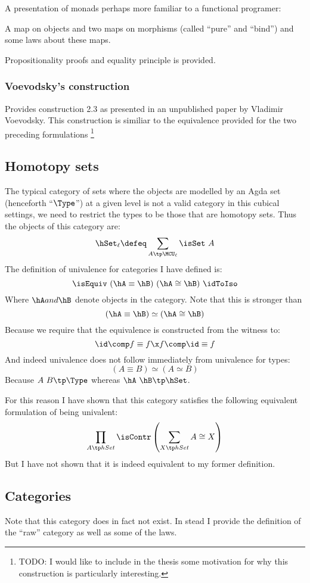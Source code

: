 A presentation of monads perhaps more familiar to a functional programer:

A map on objects and two maps on morphisms (called ``pure'' and ``bind'') and
some laws about these maps.

Propositionality proofs and equality principle is provided.

\subsubsection{Voevodsky's construction}

Provides construction 2.3 as presented in an unpublished paper by Vladimir
Voevodsky. This construction is similiar to the equivalence provided for the two
preceding formulations
\footnote{ TODO: I would like to include in the thesis some motivation for why
  this construction is particularly interesting.}

\subsection{Homotopy sets}
The typical category of sets where the objects are modelled by an Agda set
(henceforth ``$\Type$'') at a given level is not a valid category in this cubical
settings, we need to restrict the types to be those that are homotopy sets. Thus
the objects of this category are:
%
$$\hSet_\ell \defeq \sum_{A \tp \MCU_\ell} \isSet\ A$$
%
The definition of univalence for categories I have defined is:
%
$$\isEquiv\ (\hA \equiv \hB)\ (\hA \cong \hB)\ \idToIso$$
%
Where $\hA and \hB$ denote objects in the category. Note that this is stronger
than
%
$$(\hA \equiv \hB) \simeq (\hA \cong \hB)$$
%
Because we require that the equivalence is constructed from the witness to:
%
$$\id \comp f \equiv f \x f \comp \id \equiv f$$
%
And indeed univalence does not follow immediately from univalence for types:
%
$$(A \equiv B) \simeq (A \simeq B)$$
%
Because $A\ B \tp \Type$ whereas $\hA\ \hB \tp \hSet$.

For this reason I have shown that this category satisfies the following
equivalent formulation of being univalent:
%
$$\prod_{A \tp hSet} \isContr \left( \sum_{X \tp hSet} A \cong X \right)$$
%
But I have not shown that it is indeed equivalent to my former definition.
\subsection{Categories}
Note that this category does in fact not exist. In stead I provide the
definition of the ``raw'' category as well as some of the laws.


